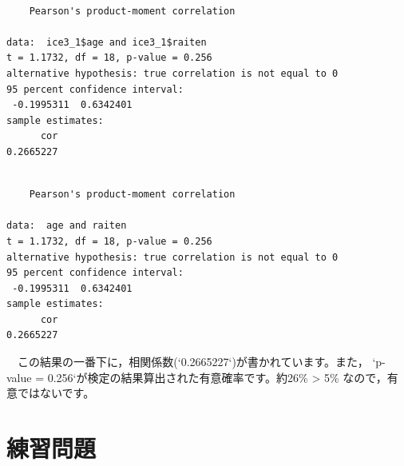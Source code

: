 \documentclass[
  letterpaper,
  DIV=11,
  numbers=noendperiod]{scrreprt}
\newenvironment{Shaded}{\begin{snugshade}}{\end{snugshade}}
\newcommand{\FunctionTok}[1]{\textcolor[rgb]{0.28,0.35,0.67}{#1}}
\newcommand{\NormalTok}[1]{\textcolor[rgb]{0.00,0.23,0.31}{#1}}
\newcommand{\OtherTok}[1]{\textcolor[rgb]{0.00,0.23,0.31}{#1}}
\newcommand{\SpecialCharTok}[1]{\textcolor[rgb]{0.37,0.37,0.37}{#1}}
\newcommand{\StringTok}[1]{\textcolor[rgb]{0.13,0.47,0.30}{#1}}
\begin{document}
\begin{Shaded}
\end{Shaded}

\begin{verbatim}

    Pearson's product-moment correlation

data:  ice3_1$age and ice3_1$raiten
t = 1.1732, df = 18, p-value = 0.256
alternative hypothesis: true correlation is not equal to 0
95 percent confidence interval:
 -0.1995311  0.6342401
sample estimates:
      cor 
0.2665227 
\end{verbatim}

\begin{Shaded}
\end{Shaded}

\begin{verbatim}

    Pearson's product-moment correlation

data:  age and raiten
t = 1.1732, df = 18, p-value = 0.256
alternative hypothesis: true correlation is not equal to 0
95 percent confidence interval:
 -0.1995311  0.6342401
sample estimates:
      cor 
0.2665227 
\end{verbatim}

　この結果の一番下に，相関係数(`0.2665227`)が書かれています。また，
`p-value = 0.256`が検定の結果算出された有意確率です。約26\%
\textgreater{} 5\% なので，有意ではないです。

\hypertarget{ux7df4ux7fd2ux554fux984c}{%
\section{練習問題}\label{ux7df4ux7fd2ux554fux984c}}
\end{document}

